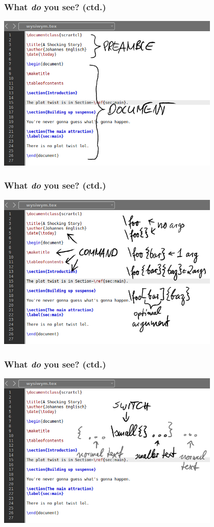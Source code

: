\documentclass[a4paper,12pt]{beamer}
\begin{document}
\begin{frame}
  \frametitle{What \emph{do} you see? (ctd.)}

  \begin{center}
    \includegraphics[width=0.8\textwidth]{images/preamble.png}
  \end{center}
\end{frame}

\begin{frame}
  \frametitle{What \emph{do} you see? (ctd.)}

  \begin{center}
    \includegraphics[width=0.8\textwidth]{images/command.png}
  \end{center}
\end{frame}

\begin{frame}
  \frametitle{What \emph{do} you see? (ctd.)}

  \begin{center}
    \includegraphics[width=0.8\textwidth]{images/switch.png}
  \end{center}
\end{frame}
\end{document}
